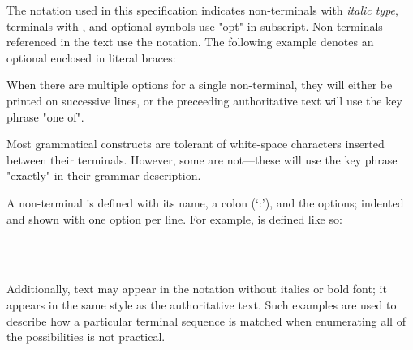 


\specsubitem
The notation used in this specification indicates non-terminals with
\textit{italic type}, terminals with , and optional
symbols use "opt" in subscript. Non-terminals referenced in the text use the
 notation. The following example denotes an optional
 enclosed in literal braces:

\begin{grammar}
\terminal{\{}  \terminal{\}}
\end{grammar}

\specsubitem
When there are multiple options for a single non-terminal, they will either be
printed on successive lines, or the preceeding authoritative text will use the
key phrase "one of".

\specsubitem
Most grammatical constructs are tolerant of white-space characters inserted
between their terminals. However, some are not---these will use the key
phrase "exactly" in their grammar description.

\specsubitem
A non-terminal is defined with its name, a colon (`:'), and the options;
indented and shown with one option per line. For example,
 is defined like so:

\begin{grammar}
\\
	 \optional{\terminal{,}}\\
	 \terminal{,} 
\end{grammar}

\specsubitem
Additionally, text may appear in the notation without italics or bold font; it
appears in the same style as the authoritative text. Such examples are used to
describe how a particular terminal sequence is matched when enumerating all of
the possibilities is not practical.

\begin{grammar}
 \\
\end{grammar}







